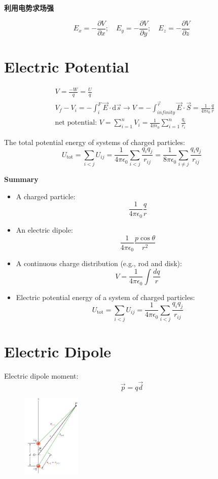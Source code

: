 \documentclass[11pt, a4paper]{article}
\begin{document}
\textbf{利用电势求场强}

$$E_x=-\frac{\partial V}{\partial x};\quad E_y=-\frac{\partial V}{\partial y};\quad E_z=-\frac{\partial V}{\partial z}$$
\section{Electric Potential}

\begin{align*}
    &V = \frac{-W}{q} = \frac{U}{q}\\
    &V_f- V_i = -\int_i^F \vec{E}\cdot\mathrm{d}\vec{s} \rightarrow V = -\int_{infinity}^{\vec{r}}\vec{E}\cdot\vec{S} = \frac{1}{4\pi \epsilon_0}\frac{q}{r}\\
    &\text{net potential: }V=\sum_{i=1}^nV_i=\frac1{4\pi\epsilon_0}\sum_{i=1}^n\frac{q_i}{r_i}
\end{align*}

The total potential energy of  systems of charged particles:
$$U_{\mathrm{tot}}=\sum_{i<j}U_{ij}=\frac1{4\pi\epsilon_0}\sum_{i<j}\frac{q_iq_j}{r_{ij}}= \frac1{8\pi\epsilon_0}\sum_{i\ne j}\frac{q_iq_j}{r_{ij}}$$

\textbf{Summary}

\begin{itemize}
    \item A charged particle: $$\frac{1}{4\pi \epsilon_0}\frac{q}{r}$$
    \item An electric dipole: $$\frac1{4\pi\epsilon_0}\frac{p\cos\theta}{r^2}$$
    \item A continuous charge distribution (e.g., rod and disk): $$V=\frac1{4\pi\epsilon_0}\int\frac{dq}r$$
    \item Electric potential energy of a system of charged particles: $$U_{\mathrm{tot}}=\sum_{i<j}U_{ij}=\frac1{4\pi\epsilon_0}\sum_{i<j}\frac{q_iq_j}{r_{ij}}$$
\end{itemize}

\section{Electric Dipole}
Electric dipole moment: $$\vec{p} = q\vec{d}$$
\begin{figure}[htbp]
    \centering
    \includegraphics[height = 4cm]{7.png}
\end{figure}
\end{document}
